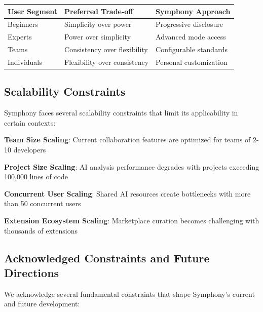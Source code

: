 \begin{center}
\begin{tabular}{@{}lll@{}}
\toprule
\textbf{User Segment} & \textbf{Preferred Trade-off} & \textbf{Symphony Approach} \\
\midrule
Beginners & Simplicity over power & Progressive disclosure \\
Experts & Power over simplicity & Advanced mode access \\
Teams & Consistency over flexibility & Configurable standards \\
Individuals & Flexibility over consistency & Personal customization \\
\bottomrule
\end{tabular}
\end{center}

\subsection*{Scalability Constraints}

Symphony faces several scalability constraints that limit its applicability in certain contexts:

\begin{expandedlist}
    \item \textbf{Team Size Scaling}: Current collaboration features are optimized for teams of 2-10 developers
    \item \textbf{Project Size Scaling}: AI analysis performance degrades with projects exceeding 100,000 lines of code
    \item \textbf{Concurrent User Scaling}: Shared AI resources create bottlenecks with more than 50 concurrent users
    \item \textbf{Extension Ecosystem Scaling}: Marketplace curation becomes challenging with thousands of extensions
\end{expandedlist}

\subsection*{Acknowledged Constraints and Future Directions}

We acknowledge several fundamental constraints that shape Symphony's current and future development:

